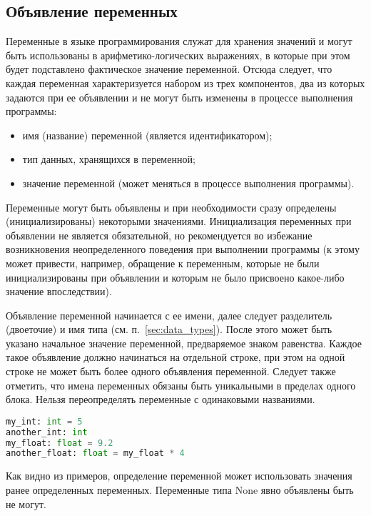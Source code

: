 \subsection{Объявление переменных}
\label{sec:var_declaration}

Переменные в языке программирования служат для хранения значений и могут быть использованы в арифметико-логических выражениях, в которые при этом будет подставлено фактическое значение переменной.
Отсюда следует, что каждая переменная характеризуется набором из трех компонентов, два из которых задаются при ее объявлении и не могут быть изменены в процессе выполнения программы:

\begin{itemize}
    \item имя (название) переменной (является идентификатором);
    \item тип данных, хранящихся в переменной;
    \item значение переменной (может меняться в процессе выполнения программы).
\end{itemize}

Переменные могут быть объявлены и при необходимости сразу определены (инициализированы) некоторыми значениями.
Инициализация переменных при объявлении не является обязательной, но рекомендуется во избежание возникновения неопределенного поведения при выполнении программы (к этому может привести, например, обращение к переменным, которые не были инициализированы при объявлении и которым не было присвоено какое-либо значение впоследствии).

Объявление переменной начинается с ее имени, далее следует разделитель (двоеточие) и имя типа (см. п.~\ref{sec:data_types}).
После этого может быть указано начальное значение переменной, предваряемое знаком равенства.
Каждое такое объявление должно начинаться на отдельной строке, при этом на одной строке не может быть более одного объявления переменной.
Следует также отметить, что имена переменных обязаны быть уникальными в пределах одного блока.
Нельзя переопределять переменные с одинаковыми названиями.

\begin{lstlisting}[language=Python, caption=Примеры объявлений переменных]
my_int: int = 5
another_int: int
my_float: float = 9.2
another_float: float = my_float * 4
\end{lstlisting}

Как видно из примеров, определение переменной может использовать значения ранее определенных переменных.
Переменные типа None явно объявлены быть не могут.

